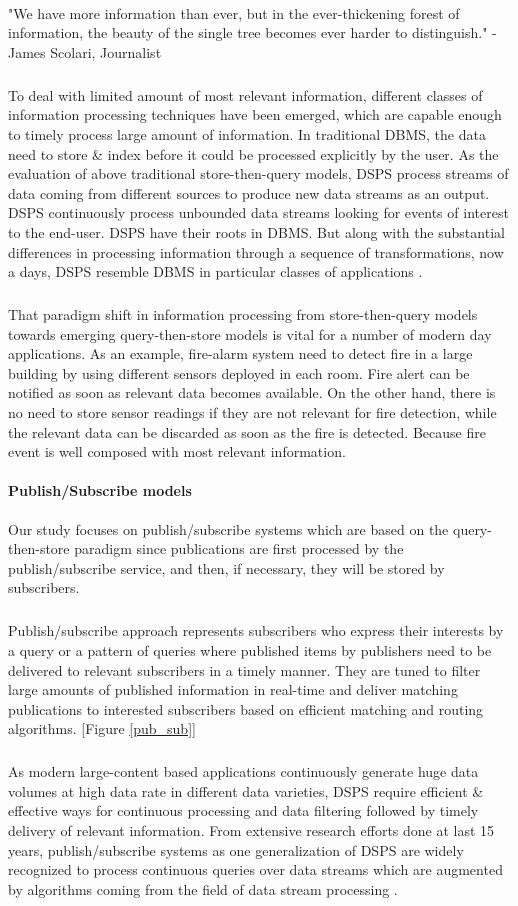 \documentclass[a4paper,12pt,oneside]{book}
\theoremstyle{definition}
\theoremstyle{remark}
\begin{document}
\paragraph*{}
"We have more information than ever, but in the ever-thickening forest of information, the beauty of the single tree becomes ever harder to distinguish." - James Scolari, Journalist
\subparagraph*{}
To deal with limited amount of most relevant information, different classes of information processing techniques have been emerged, which are capable enough to timely process large amount of information. In traditional \ac{DBMS}, the data need to store \& index before it could be processed explicitly by the user. As the evaluation of above traditional store-then-query models, \ac{DSPS} process streams of data coming from different sources to produce new data streams as an output. \ac{DSPS} continuously process unbounded data streams looking for events of interest to the end-user. \ac{DSPS} have their roots in \ac{DBMS}. But along with the substantial differences in processing information through a sequence of transformations, now a days, \ac{DSPS} resemble \ac{DBMS} in particular classes of applications \cite{Cugola2012}. 
\subparagraph*{}
That paradigm shift in information processing from store-then-query models towards emerging query-then-store models is vital for a number of modern day applications. As an example, fire-alarm system need to detect fire in a large building by using different sensors deployed in each room. Fire alert can be notified as soon as relevant data becomes available. On the other hand, there is no need to store sensor readings if they are not relevant for fire detection, while the relevant data can be discarded as soon as the fire is detected. Because fire event is well composed with most relevant information. 

\paragraph*{Publish/Subscribe models}
Our study focuses on publish/subscribe systems which are based on the query-then-store paradigm since publications are first processed by the publish/subscribe service, and then, if necessary, they will be stored by subscribers.
\subparagraph*{}
Publish/\-subscribe approach represents subscribers who express their interests by a query or a pattern of queries where published items by publishers need to be delivered to relevant subscribers in a timely manner. They are tuned to filter large amounts of published information in real-time and deliver matching publications to interested subscribers based on efficient matching and routing algorithms. [Figure \ref{pub_sub}]
\subparagraph*{}
As modern large-content based applications continuously generate huge data volumes at high data rate in different data varieties, \ac{DSPS} require efficient \& effective ways for continuous processing and data filtering followed by timely delivery of relevant information. From extensive research efforts done at last 15 years,  publish/\-subscribe systems as one generalization of \ac{DSPS} are widely recognized to process continuous queries over data streams which are augmented by algorithms coming from the field of data stream processing \cite{Kermarrec2008}. 
\end{document}
